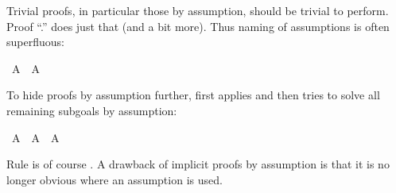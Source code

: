 \begin{isabellebody}
\begin{isamarkuptext}
Trivial proofs, in particular those by assumption, should be trivial
to perform. Proof ``.'' does just that (and a bit more). Thus
naming of assumptions is often superfluous:%
\end{isamarkuptext}%
\isamarkuptrue%
\ {\isachardoublequote}A\ {\isasymlongrightarrow}\ A{\isachardoublequote}\isanewline
\isamarkupfalse%
\isamarkupfalse%
\isamarkupfalse%
\isamarkupfalse%
\isamarkupfalse%
\isamarkupfalse%
%
\begin{isamarkuptext}%
To hide proofs by assumption further, 
first applies  and then tries to solve all remaining subgoals
by assumption:%
\end{isamarkuptext}%
\isamarkuptrue%
\ {\isachardoublequote}A\ {\isasymlongrightarrow}\ A\ {\isasymand}\ A{\isachardoublequote}\isanewline
\isamarkupfalse%
\isamarkupfalse%
\isamarkupfalse%
\isamarkupfalse%
\isamarkupfalse%
\isamarkupfalse%
%
\begin{isamarkuptext}%
\noindent Rule  is of course .
A drawback of implicit proofs by assumption is that it
is no longer obvious where an assumption is used.


\end{isamarkuptext}
\end{isabellebody}
